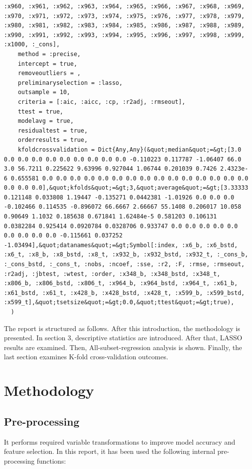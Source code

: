 \documentclass{article}
\begin{document}
\begin{lstlisting}
:x960, :x961, :x962, :x963, :x964, :x965, :x966, :x967, :x968, :x969, :x970, :x971, :x972, :x973, :x974, :x975, :x976, :x977, :x978, :x979, :x980, :x981, :x982, :x983, :x984, :x985, :x986, :x987, :x988, :x989, :x990, :x991, :x992, :x993, :x994, :x995, :x996, :x997, :x998, :x999, :x1000, :_cons],
    method = :precise,
    intercept = true,
    removeoutliers = ,
    preliminaryselection = :lasso,
    outsample = 10,
    criteria = [:aic, :aicc, :cp, :r2adj, :rmseout],
    ttest = true,
    modelavg = true,
    residualtest = true,
    orderresults = true,
    kfoldcrossvalidation = Dict{Any,Any}(&quot;median&quot;=&gt;[3.0 0.0 0.0 0.0 0.0 0.0 0.0 0.0 0.0 0.0 -0.110223 0.117787 -1.06407 66.0 3.0 56.7211 0.225622 9.63996 0.927044 1.06744 0.201039 0.7426 2.4323e-6 0.655581 0.0 0.0 0.0 0.0 0.0 0.0 0.0 0.0 0.0 0.0 0.0 0.0 0.0 0.0 0.0 0.0 0.0 0.0],&quot;kfolds&quot;=&gt;3,&quot;average&quot;=&gt;[3.33333 0.121148 0.033808 1.19447 -0.135271 0.0442381 -1.01926 0.0 0.0 0.0 -0.102466 0.114535 -0.896072 66.6667 2.66667 55.1408 0.206017 10.058 0.90649 1.1032 0.185638 0.671841 1.62484e-5 0.581203 0.106131 0.0382284 0.925414 0.0920784 0.0328706 0.933747 0.0 0.0 0.0 0.0 0.0 0.0 0.0 0.0 0.0 -0.115661 0.037252 -1.03494],&quot;datanames&quot;=&gt;Symbol[:index, :x6_b, :x6_bstd, :x6_t, :x8_b, :x8_bstd, :x8_t, :x932_b, :x932_bstd, :x932_t, :_cons_b, :_cons_bstd, :_cons_t, :nobs, :ncoef, :sse, :r2, :F, :rmse, :rmseout, :r2adj, :jbtest, :wtest, :order, :x348_b, :x348_bstd, :x348_t, :x806_b, :x806_bstd, :x806_t, :x964_b, :x964_bstd, :x964_t, :x61_b, :x61_bstd, :x61_t, :x428_b, :x428_bstd, :x428_t, :x599_b, :x599_bstd, :x599_t],&quot;tsetsize&quot;=&gt;0.0,&quot;ttest&quot;=&gt;true),
  )
\end{lstlisting}

The report is structured as follows. After this introduction, the methodology is presented. In section 3, descriptive statistics are introduced. After that, LASSO results are examined. Then, All-subset-regression analysis is shown. Finally, the last section examines K-fold cross-validation outcomes.

\section{Methodology}

\subsection{Pre-processing}
It performs required variable transformations to improve model accuracy and feature selection. In this report, it has been used the following internal pre-processing functions:
\end{document}
